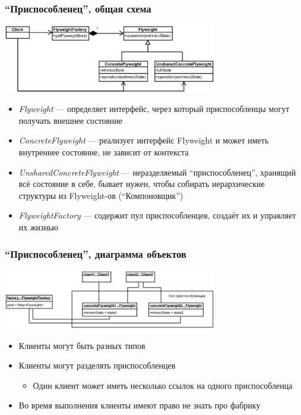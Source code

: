 \documentclass[xetex,mathserif,serif]{beamer}
\begin{document}
	\begin{frame}
		\frametitle{``Приспособленец'', общая схема}
		\begin{center}
			\includegraphics[width=0.7\textwidth]{flyweight.png}
		\end{center}
		\begin{footnotesize}
			\begin{itemize}
				\item \textit{Flyweight} --- определяет интерфейс, через который приспособленцы могут получать внешнее состояние
				\item \textit{ConcreteFlyweight} --- реализует интерфейс Flyweight и может иметь внутреннее состояние, не зависит от контекста
				\item \textit{UnsharedConcreteFlyweight} --- неразделяемый ``приспособленец'', хранящий всё состояние в себе, бывает нужен, чтобы собирать иерархические структуры из Flyweight-ов (``Компоновщик'')
				\item \textit{FlyweightFactory} --- содержит пул приспособленцев, создаёт их и управляет их жизнью
			\end{itemize}
		\end{footnotesize}
	\end{frame}

	\begin{frame}
		\frametitle{``Приспособленец'', диаграмма объектов}
		\begin{center}
			\includegraphics[width=0.7\textwidth]{flyweightObjects.png}
		\end{center}
		\begin{itemize}
			\item Клиенты могут быть разных типов
			\item Клиенты могут разделять приспособленцев
			\begin{itemize}
				\item Один клиент может иметь несколько ссылок на одного приспособленца
			\end{itemize}
			\item Во время выполнения клиенты имеют право не знать про фабрику
		\end{itemize}
	\end{frame}
\end{document}

